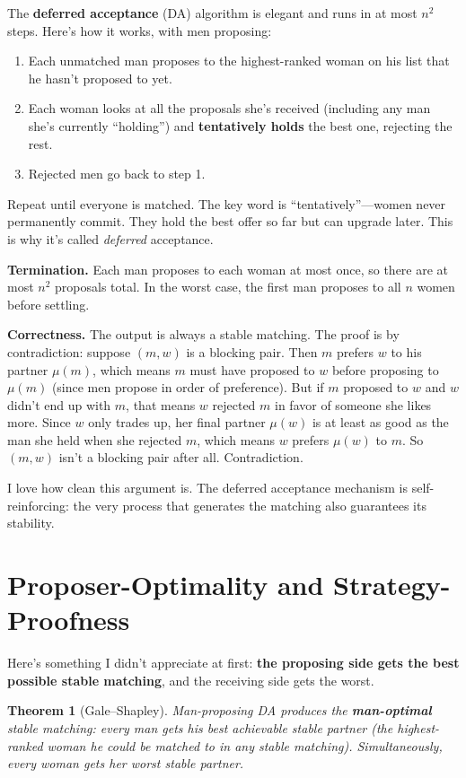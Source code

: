 \documentclass[11pt]{article}
\newtheorem{theorem}{Theorem}
\begin{document}
The \textbf{deferred acceptance} (DA) algorithm is elegant and runs in at most $n^2$ steps. Here's how it works, with men proposing:

\begin{enumerate}
\item Each unmatched man proposes to the highest-ranked woman on his list that he hasn't proposed to yet.
\item Each woman looks at all the proposals she's received (including any man she's currently ``holding'') and \textbf{tentatively holds} the best one, rejecting the rest.
\item Rejected men go back to step 1.
\end{enumerate}

Repeat until everyone is matched. The key word is ``tentatively''---women never permanently commit. They hold the best offer so far but can upgrade later. This is why it's called \emph{deferred} acceptance.

\textbf{Termination.} Each man proposes to each woman at most once, so there are at most $n^2$ proposals total. In the worst case, the first man proposes to all $n$ women before settling.

\textbf{Correctness.} The output is always a stable matching. The proof is by contradiction: suppose $(m, w)$ is a blocking pair. Then $m$ prefers $w$ to his partner $\mu(m)$, which means $m$ must have proposed to $w$ before proposing to $\mu(m)$ (since men propose in order of preference). But if $m$ proposed to $w$ and $w$ didn't end up with $m$, that means $w$ rejected $m$ in favor of someone she likes more. Since $w$ only trades up, her final partner $\mu(w)$ is at least as good as the man she held when she rejected $m$, which means $w$ prefers $\mu(w)$ to $m$. So $(m, w)$ isn't a blocking pair after all. Contradiction.

I love how clean this argument is. The deferred acceptance mechanism is self-reinforcing: the very process that generates the matching also guarantees its stability.

\section{Proposer-Optimality and Strategy-Proofness}

Here's something I didn't appreciate at first: \textbf{the proposing side gets the best possible stable matching}, and the receiving side gets the worst.

\begin{theorem}[Gale--Shapley]
Man-proposing DA produces the \textbf{man-optimal} stable matching: every man gets his best achievable stable partner (the highest-ranked woman he could be matched to in any stable matching). Simultaneously, every woman gets her worst stable partner.
\end{theorem}
\end{document}
